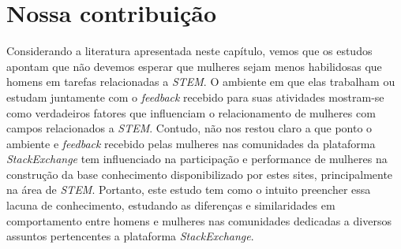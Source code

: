 \section{Nossa contribuição}

Considerando a literatura apresentada neste capítulo, vemos que os estudos apontam que não devemos esperar que mulheres sejam menos habilidosas que homens em tarefas relacionadas a \emph{STEM}. O ambiente em que elas trabalham ou estudam juntamente com o \emph{feedback} recebido para suas atividades mostram-se como verdadeiros fatores que influenciam o relacionamento de mulheres com campos relacionados a \emph{STEM}. Contudo, não nos restou claro a que ponto o ambiente e \emph{feedback} recebido pelas mulheres nas comunidades da plataforma \emph{StackExchange} tem influenciado na participação e performance de mulheres na construção da base conhecimento disponibilizado por estes sites, principalmente na área de \emph{STEM}. Portanto, este estudo tem como o intuito preencher essa lacuna de conhecimento, estudando as diferenças e similaridades em comportamento entre homens e mulheres nas comunidades dedicadas a diversos assuntos pertencentes a plataforma \emph{StackExchange}.

